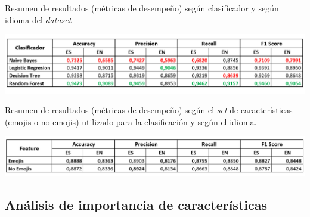 \begin{table}[H]
    \centering
    \caption{Resumen de resultados (métricas de desempeño) según clasificador y según idioma del \textit{dataset}}
    \label{tab:clf_summary}
    \includegraphics[width=\textwidth]{doc/images/summary_results_clf.png}
\end{table}

\begin{table}[H]
    \centering
    \caption{Resumen de resultados (métricas de desempeño) según el \textit{set} de características (emojis o no emojis) utilizado para la clasificación y según el idioma.}
    \label{tab:emojis_summary}
    \includegraphics[width=\textwidth]{doc/images/summary_results_emoji.png}
\end{table}

\subsection{Análisis de importancia de características}